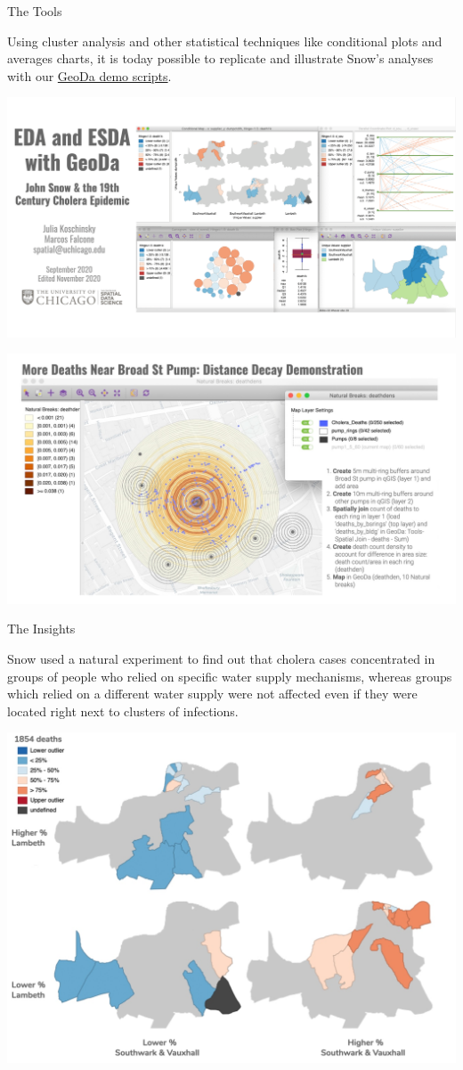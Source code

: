 \documentclass[
]{book}
\begin{document}
The Tools

Using cluster analysis and other statistical techniques like conditional plots and averages charts, it is today possible to replicate and illustrate Snow's analyses with our \href{https://geodacenter.github.io/data-and-lab/data/geoda_scripts_snow.pdf}{GeoDa demo scripts}.

\includegraphics{images/snow5.png}

\includegraphics{images/snow6.jpg}

The Insights

Snow used a natural experiment to find out that cholera cases concentrated in groups of people who relied on specific water supply mechanisms, whereas groups which relied on a different water supply were not affected even if they were located right next to clusters of infections.

\includegraphics{images/snow7.jpg}
\end{document}
